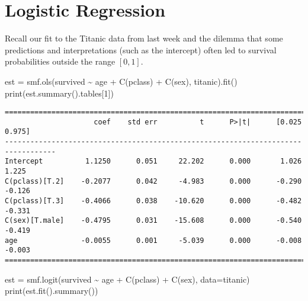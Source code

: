 \documentclass[
  letterpaper,
  DIV=11,
  numbers=noendperiod]{scrreprt}
\newenvironment{Shaded}{\begin{snugshade}}{\end{snugshade}}
\newcommand{\BuiltInTok}[1]{\textcolor[rgb]{0.00,0.23,0.31}{#1}}
\newcommand{\DecValTok}[1]{\textcolor[rgb]{0.68,0.00,0.00}{#1}}
\newcommand{\NormalTok}[1]{\textcolor[rgb]{0.00,0.23,0.31}{#1}}
\newcommand{\OperatorTok}[1]{\textcolor[rgb]{0.37,0.37,0.37}{#1}}
\newcommand{\StringTok}[1]{\textcolor[rgb]{0.13,0.47,0.30}{#1}}
\begin{document}
\hypertarget{logistic-regression}{%
\section{Logistic Regression}\label{logistic-regression}}

Recall our fit to the Titanic data from last week and the dilemma that
some predictions and interpretations (such as the intercept) often led
to survival probabilities outside the range \([0,1]\).

\begin{Shaded}
\begin{Highlighting}[]
\NormalTok{est }\OperatorTok{=}\NormalTok{ smf.ols(}\StringTok{\textquotesingle{}survived \textasciitilde{} age + C(pclass) + C(sex)\textquotesingle{}}\NormalTok{, titanic).fit()}
\BuiltInTok{print}\NormalTok{(est.summary().tables[}\DecValTok{1}\NormalTok{])}
\end{Highlighting}
\end{Shaded}

\begin{verbatim}
==================================================================================
                     coef    std err          t      P>|t|      [0.025      0.975]
----------------------------------------------------------------------------------
Intercept          1.1250      0.051     22.202      0.000       1.026       1.225
C(pclass)[T.2]    -0.2077      0.042     -4.983      0.000      -0.290      -0.126
C(pclass)[T.3]    -0.4066      0.038    -10.620      0.000      -0.482      -0.331
C(sex)[T.male]    -0.4795      0.031    -15.608      0.000      -0.540      -0.419
age               -0.0055      0.001     -5.039      0.000      -0.008      -0.003
==================================================================================
\end{verbatim}

\begin{Shaded}
\begin{Highlighting}[]
\NormalTok{est }\OperatorTok{=}\NormalTok{ smf.logit(}\StringTok{\textquotesingle{}survived \textasciitilde{} age + C(pclass) + C(sex)\textquotesingle{}}\NormalTok{, data}\OperatorTok{=}\NormalTok{titanic)}
\BuiltInTok{print}\NormalTok{(est.fit().summary())}
\end{Highlighting}
\end{Shaded}
\end{document}

